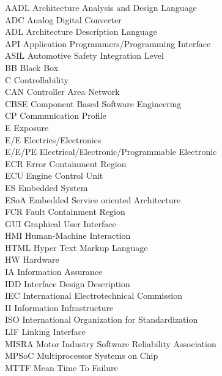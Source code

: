 AADL \tocdotfill Architecture Analysis and Design Language\\
ADC \tocdotfill Analog Digital Converter\\
ADL \tocdotfill Architecture Description Language\\
API \tocdotfill Application Programmers/Programming Interface\\
ASIL \tocdotfill Automotive Safety Integration Level\\
BB \tocdotfill Black Box\\
C \tocdotfill Controllability\\
CAN \tocdotfill Controller Area Network\\
CBSE \tocdotfill Component Based Software Engineering\\
CP \tocdotfill Communication Profile\\
E \tocdotfill Exposure\\
E/E \tocdotfill Electrics/Electronics\\
E/E/PE \tocdotfill Electrical/Electronic/Programmable Electronic\\
ECR \tocdotfill Error Containment Region\\
ECU \tocdotfill Engine Control Unit\\
ES \tocdotfill Embedded System\\
ESoA \tocdotfill Embedded Service oriented Architecture\\
FCR \tocdotfill Fault Containment Region\\
GUI \tocdotfill Graphical User Interface\\
HMI \tocdotfill Human-Machine Interaction\\
HTML \tocdotfill Hyper Text Markup Language\\
HW \tocdotfill Hardware\\
IA \tocdotfill Information Assurance\\
IDD \tocdotfill Interface Design Description\\
IEC \tocdotfill International Electrotechnical Commission\\
II \tocdotfill Information Infrastructure\\
ISO \tocdotfill International Organization for Standardization\\
LIF \tocdotfill Linking Interface\\
MISRA \tocdotfill Motor Industry Software Reliability Association\\
MPSoC \tocdotfill Multiprocessor Systems on Chip\\
MTTF \tocdotfill Mean Time To Failure\\

